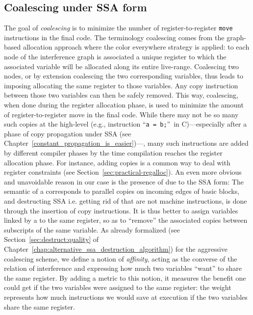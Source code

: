 {\subsection{Coalescing under SSA form}
The goal of \emph{coalescing} is to minimize the number of register-to-register {\tt move} instructions in the final code.
The terminology coalescing comes from the graph-based allocation approach where the color everywhere strategy is applied:
to each node of the interference graph is associated a unique register to which the associated variable will be allocated along its entire live-range.
Coalescing two nodes, or by extension coalescing the two corresponding variables, thus leads to imposing allocating the same register to those variables.
Any copy instruction between those two variables can then be safely removed.
This way, coalescing, when done during the register allocation phase, is used to minimize the amount of register-to-register move in the final code.
While there may not be so many such copies at the high-level (e.g., instruction ``{\tt a = b;}''~in C)---especially after a phase of copy propagation under SSA (see Chapter~\ref{constant_propagation_is_easier})---, many such instructions are added by different compiler phases by the time compilation reaches the register allocation phase. 
For instance, adding copies is a common way to deal with register constraints (see Section~\ref{sec:practical-regalloc}). 
An even more obvious and unavoidable reason in our case is the presence of \phifuns due to the SSA form:
The semantic of a \phifun corresponds to parallel copies on incoming edges of basic blocks, and destructing SSA i.e. getting rid of \phifuns that are not machine instructions, is done through the insertion of copy instructions. 
It is thus better to assign variables linked by a \phifun to the same register, so as to ``remove'' the associated copies between subscripts of the same variable.
As already formalized (see Section~\ref{sec:destruct:quality} of Chapter~\ref{chap:alternative_ssa_destruction_algorithm}) for the aggressive coalescing scheme, we define a notion of \emph{affinity}, acting as the converse of the relation of interference and expressing how much two variables ``want'' to share the same register. 
By adding a metric to this notion, it measures the benefit one could get if the two variables were assigned to the same register: 
the weight represents how much instructions we would save at execution if the two variables share the same register. 


}
